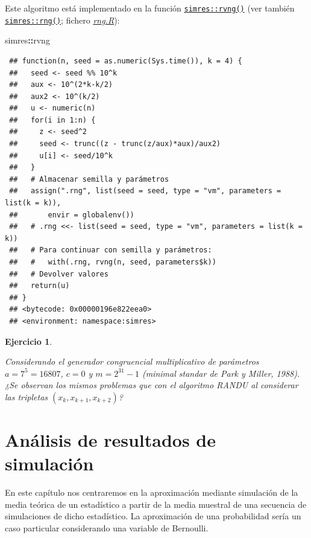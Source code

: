 \documentclass[
  spanish,
  10pt,
]{book}
\newenvironment{Shaded}{\begin{snugshade}}{\end{snugshade}}
\newcommand{\NormalTok}[1]{#1}
\newcommand{\SpecialCharTok}[1]{\textcolor[rgb]{0.81,0.36,0.00}{\textbf{#1}}}
\theoremstyle{break}
\newtheorem{exercise}{Ejercicio}[chapter]
\theoremstyle{nonumberplain}
\begin{document}
Este algoritmo está implementado en la función \href{https://rubenfcasal.github.io/simres/reference/set.rng.html}{\texttt{simres::rvng()}} (ver también \href{https://rubenfcasal.github.io/simres/reference/set.rng.html}{\texttt{simres::rng()}}; fichero \href{R/rng.R}{\emph{rng.R}}):

\begin{Shaded}
\begin{Highlighting}[]
\NormalTok{simres}\SpecialCharTok{::}\NormalTok{rvng}
\end{Highlighting}
\end{Shaded}

\begin{verbatim}
 ## function(n, seed = as.numeric(Sys.time()), k = 4) {
 ##   seed <- seed %% 10^k
 ##   aux <- 10^(2*k-k/2)
 ##   aux2 <- 10^(k/2)
 ##   u <- numeric(n)
 ##   for(i in 1:n) {
 ##     z <- seed^2
 ##     seed <- trunc((z - trunc(z/aux)*aux)/aux2)
 ##     u[i] <- seed/10^k
 ##   }
 ##   # Almacenar semilla y parámetros
 ##   assign(".rng", list(seed = seed, type = "vm", parameters = list(k = k)),
 ##       envir = globalenv())
 ##   # .rng <<- list(seed = seed, type = "vm", parameters = list(k = k))
 ##   # Para continuar con semilla y parámetros:
 ##   #   with(.rng, rvng(n, seed, parameters$k))
 ##   # Devolver valores
 ##   return(u)
 ## }
 ## <bytecode: 0x00000196e822eea0>
 ## <environment: namespace:simres>
\end{verbatim}

\begin{exercise}
\protect\hypertarget{exr:parkmiller}{}\label{exr:parkmiller}

Considerando el generador congruencial multiplicativo de parámetros \(a=7^{5}=16807\), \(c=0\) y \(m=2^{31}-1\) (\emph{minimal standar} de Park y Miller, 1988).
¿Se observan los mismos problemas que con el algoritmo RANDU al considerar las tripletas \((x_{k},x_{k+1},x_{k+2})\)?
\end{exercise}

\chapter{Análisis de resultados de simulación}\label{resultados}

En este capítulo nos centraremos en la aproximación mediante simulación de la media teórica de un estadístico a partir de la media muestral de una secuencia de simulaciones de dicho estadístico.
La aproximación de una probabilidad sería un caso particular considerando una variable de Bernoulli.
\end{document}
